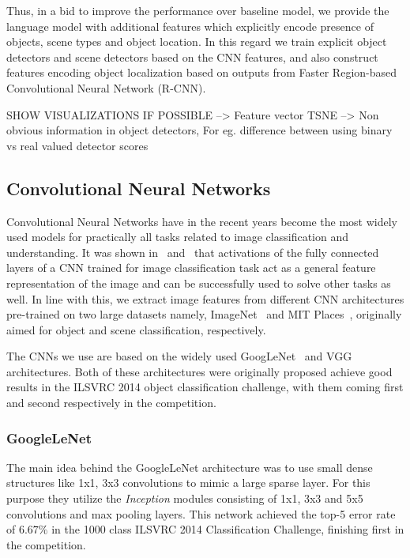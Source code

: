 Thus, in a bid to improve the performance over baseline model, we provide the
language model with additional features which explicitly encode presence of
objects, scene types and object location.
In this regard we train explicit object detectors and scene detectors based on
the CNN features, and also construct features encoding object localization based
on outputs from Faster Region-based Convolutional Neural Network (R-CNN).

SHOW VISUALIZATIONS IF POSSIBLE
    --> Feature vector TSNE
    --> Non obvious information in object detectors, For eg. difference between
    using binary vs real valued detector scores
\subsection{Convolutional Neural Networks}
Convolutional Neural Networks have in the recent years become the most
widely used models for practically all tasks related to image
classification and understanding.
It was shown in~\cite{Donahue2014} and~\cite{Razavian2014CVPR} that
activations of the fully connected layers of a CNN trained for image
classification task act as a general feature representation of the
image and can be successfully used to solve other tasks as well.
In line with this, we extract image features from different CNN architectures
pre-trained on two large datasets namely, ImageNet~\cite{ImagenetOrig} and MIT
Places~\cite{Zhou2014NIPS}, originally aimed for object and scene
classification, respectively.

The CNNs we use are based on the widely used
GoogLeNet~\cite{DBLP:journals/corr/SzegedyLJSRAEVR14} and VGG~\cite{Simonyan14c}
architectures. 
Both of these architectures were originally proposed achieve good results in the
ILSVRC 2014 object classification challenge, with them coming first and second
respectively in the competition.

\subsubsection{GoogleLeNet} 
\label{subsec:gCNN}
The main idea behind the GoogleLeNet architecture was to use small dense
structures like 1x1, 3x3 convolutions to mimic a large sparse layer.
For this purpose they utilize the \emph{Inception} modules consisting of 1x1,
3x3 and 5x5 convolutions and max pooling layers.
This network achieved the top-5 error rate of $6.67\%$ in the 1000 class ILSVRC 2014
Classification Challenge, finishing first in the competition.

